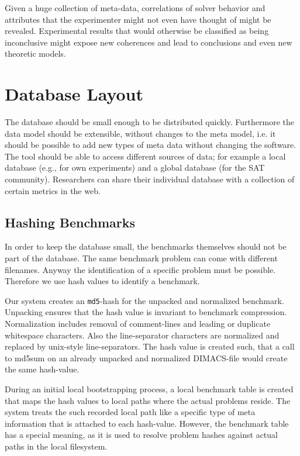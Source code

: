 \documentclass{easychair}
\begin{document}
Given a huge collection of meta-data, correlations of solver behavior and attributes that the experimenter might not even have thought of might be revealed. Experimental results that would otherwise be classified as being inconclusive might expose new coherences and lead to conclusions and even new theoretic models.

\section{Database Layout}
\label{sec:dblayout}

The database should be small enough to be distributed quickly. Furthermore the data model should be extensible, without changes to the meta model, i.e. it should be possible to add new types of meta data without changing the software. The tool should be able to access different sources of data; for example a local database (e.g., for own experiments) and a global database (for the SAT community). Researchers can share their individual database with a collection of certain metrics in the web.

\subsection{Hashing Benchmarks}
\label{db:hashing}

In order to keep the database small, the benchmarks themselves should not be part of the database. The same benchmark problem can come with different filenames. Anyway the identification of a specific problem must be possible. Therefore we use hash values to identify a benchmark. 

Our system creates an \texttt{md5}-hash for the unpacked and normalized benchmark. 
Unpacking ensures that the hash value is invariant to benchmark compression. 
Normalization includes removal of comment-lines and leading or duplicate whitespace characters. 
Also the line-separator characters are normalized and replaced by unix-style line-separators.
The hash value is created such, that a call to \textsf{md5sum} on an already unpacked and normalized DIMACS-file would create the same hash-value.

During an initial local bootstrapping process, a local benchmark table is created that maps the hash values to local paths where the actual problems reside. The system treats the such recorded local path like a specific type of meta information that is attached to each hash-value. However, the benchmark table has a special meaning, as it is used to resolve problem hashes against actual paths in the local filesystem.
\end{document}
